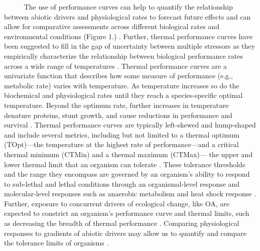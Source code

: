 \documentclass[
]{article}
\begin{document}
~~~~~ The use of performance curves can help to quantify the
relationship between abiotic drivers and physiological rates to forecast
future effects \cite{kroeker2017embracing} and can allow for comparative
assessments across different biological rates and environmental
conditions (Figure 1.)
\cite{schulte2011thermal, silbiger2019comparative, silva2021local, padfield2021rtpc, becker2020nutrient}.
Further, thermal performance curves have been suggested to fill in the
gap of uncertainty between multiple stressors as they empirically
characterize the relationship between biological performance rates
across a wide range of temperatures
\cite{padfield2021rtpc, schulte2011thermal, silbiger2019comparative}.
Thermal performance curves are a univariate function that describes how
some measure of performance (e.g., metabolic rate) varies with
temperature. As temperature increases so do the biochemical and
physiological rates until they reach a species-specific optimal
temperature. Beyond the optimum rate, further increases in temperature
denature proteins, stunt growth, and cause reductions in performance and
survival \cite{somero2002thermal, portner2002climate}. Thermal
performance curves are typically left-skewed and hump-shaped and include
several metrics, including but not limited to a thermal optimum
(TOpt)---the temperature at the highest rate of performance---and a
critical thermal minimum (CTMin) and a thermal maximum (CTMax)--- the
upper and lower thermal limit that an organism can tolerate
\cite{schulte2011thermal, huey1979integrating, huey1989evolution}. These
tolerance thresholds and the range they encompass are governed by an
organism's ability to respond to sub-lethal and lethal conditions
through an organismal-level response and molecular-level responses such
as anaerobic metabolism and heat shock response
\cite{portner2017oxygen, somero2002thermal}. Further, exposure to
concurrent drivers of ecological change, like OA, are expected to
constrict an organism's performance curve and thermal limits, such as
decreasing the breadth of thermal performance
\cite{portner2008physiology, portner2010oxygen}. Comparing physiological
responses to gradients of abiotic drivers may allow us to quantify and
compare the tolerance limits of organisms
\cite{silbiger2019comparative}.
\end{document}
